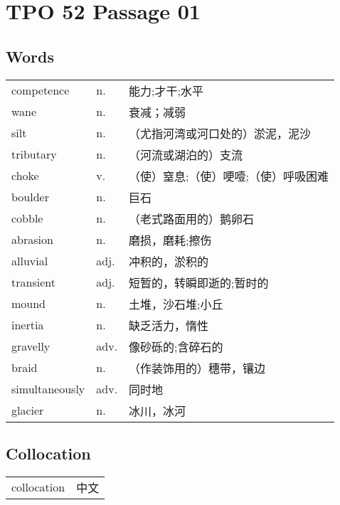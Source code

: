 \section{TPO 52 Passage 01}

\subsection{Words}

\begin{tabular}{lll}
    competence     & n.   & 能力;才干;水平            \\
    wane           & n.   & 衰减；减弱               \\
    silt           & n.   & （尤指河湾或河口处的）淤泥，泥沙    \\
    tributary      & n.   & （河流或湖泊的）支流          \\
    choke          & v.   & （使）窒息;（使）哽噎;（使）呼吸困难 \\
    boulder        & n.   & 巨石                  \\
    cobble         & n.   & （老式路面用的）鹅卵石         \\
    abrasion       & n.   & 磨损，磨耗;擦伤            \\
    alluvial       & adj. & 冲积的，淤积的             \\
    transient      & adj. & 短暂的，转瞬即逝的;暂时的       \\
    mound          & n.   & 土堆，沙石堆;小丘           \\
    inertia        & n.   & 缺乏活力，惰性             \\
    gravelly       & adv. & 像砂砾的;含碎石的           \\
    braid          & n.   & （作装饰用的）穗带，镶边        \\
    simultaneously & adv. & 同时地                 \\
    glacier        & n.   & 冰川，冰河               \\
\end{tabular}

\subsection{Collocation}

\begin{tabular}{ll}
    collocation & 中文 \\
\end{tabular}

